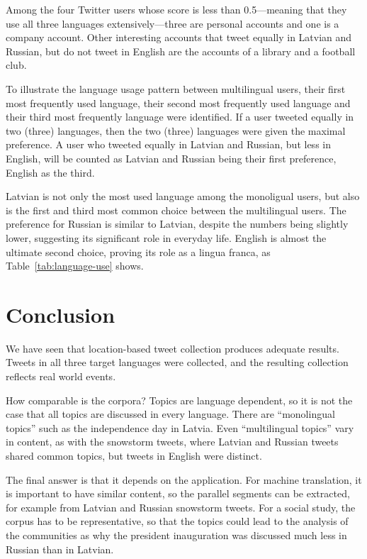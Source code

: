 \documentclass[11pt,a4paper]{article}
\begin{document}
Among the four Twitter users whose score is less than 0.5---meaning that they use all three languages extensively---three are personal accounts and one is a company account. Other interesting accounts that tweet equally in Latvian and Russian, but do not tweet in English are the accounts of a library and a football club.

To illustrate the language usage pattern between multilingual users, their first most frequently used language, their second most frequently used language and their third most frequently language were identified. If a user tweeted equally in two (three) languages, then the two (three) languages were given the maximal preference. A user who tweeted equally in Latvian and Russian, but less in English, will be counted as Latvian and Russian being their first preference, English as the third.

Latvian is not only the most used language among the monoligual users, but also is the first and third most common choice between the multilingual users. The preference for Russian is similar to Latvian, despite the numbers being slightly lower, suggesting its significant role in everyday life. English is almost the ultimate second choice, proving its role as a lingua franca, as Table~\ref{tab:language-use} shows.



\section{Conclusion}

We have seen that location-based tweet collection produces adequate results. Tweets in all three target languages were collected, and the resulting collection reflects real world events.

How comparable is the corpora? Topics are language dependent, so it is not the case that all topics are discussed in every language. There are ``monolingual topics'' such as the independence day in Latvia. Even ``multilingual topics'' vary in content, as with the snowstorm tweets, where Latvian and Russian tweets shared common topics, but tweets in English were distinct.

%
The final answer is that it depends on the application. For machine translation, it is important to have similar content, so the parallel segments can be extracted, for example from Latvian and Russian snowstorm tweets. For a social study, the corpus has to be representative, so that the topics could lead to the analysis of the communities as why the president inauguration was discussed much less in Russian than in Latvian.
\end{document}
